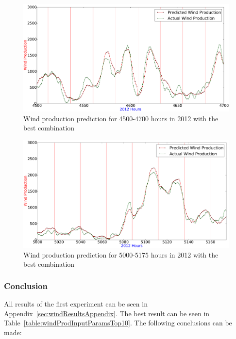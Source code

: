 \begin{figure}[H]
\centering
\includegraphics[width=0.99\linewidth]{billeder/bestInputCombi4500-4700.png}
\caption{Wind production prediction for 4500-4700 hours in 2012 with the best combination}
\label{fig:bestInputCombi4500-4700}
\end{figure} 

\begin{figure}[H]
\centering
\includegraphics[width=0.99\linewidth]{billeder/bestInputParameterLowNumbers.png}
\caption{Wind production prediction for 5000-5175 hours in 2012 with the best combination}
\label{fig:bestInputParameterLowNumbers}
\end{figure}   

\subsubsection{Conclusion}
All results of the first experiment can be seen in Appendix~\ref{sec:windResultsAppendix}. The best result can be seen in Table~\ref{table:windProdInputParamsTop10}. The following conclusions can be made: 

